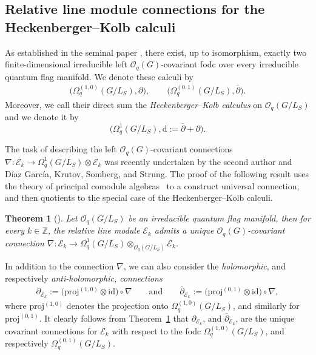 \documentclass[pdftex]{sigma}
\numberwithin{equation}{section}
\newtheorem{Theorem}{Theorem}[section]
\begin{document}
\subsection{Relative line module connections for the Heckenberger--Kolb calculi}\label{section3.2}

As established in the seminal paper \cite{HKdR}, there exist, up to isomorphism, exactly two finite-dimensional irreducible left $\mathcal{O}_q(G)$-covariant fodc over every irreducible quantum flag manifold. We denote these calculi by
\begin{gather*}
\big(\Omega^{(1,0)}_q(G/L_S), \partial\big), \qquad \big(\Omega^{(0,1)}_q(G/L_S),\overline{\partial}\big).
\end{gather*}
Moreover, we call their direct sum the \emph{Heckenberger--Kolb calculus} on $\mathcal{O}_q(G/L_S)$ and we denote it by
\[
\big(\Omega^1_q(G/L_S),\mathrm{d}:=\overline{\partial}+\partial\big) .
\]

The task of describing the left $\mathcal{O}_q(G)$-covariant connections $\nabla\colon \mathcal{E}_k \to \Omega^1_q(G/L_S) \otimes \mathcal{E}_k$ was recently undertaken by the second author and D\'iaz Garc\'ia, Krutov, Somberg, and Strung. The proof of the following result uses the theory of principal comodule algebras~\cite{TBGS} to a construct universal connection, and then quotients to the special case of the Heckenberger--Kolb calculi.

\begin{Theorem}[{\cite[Theorem 4.5]{HVBQFM}}] \label{thm:CovConn}
Let $\mathcal{O}_q(G/L_S)$ be an irreducible quantum flag manifold, then for every $k \in \mathbb{Z}$, the relative line module $\mathcal{E}_k$ admits a unique $\mathcal{O}_q(G)$-covariant connection $\nabla\colon \mathcal{E}_k \to \Omega^1_q(G/L_S) \otimes_{\mathcal{O}_q(G/L_S)} \mathcal{E}_k$.
\end{Theorem}

In addition to the connection $\nabla$, we can also consider the \emph{holomorphic}, and respectively \emph{anti-holomorphic, connections}
\begin{gather*}
\partial_{\mathcal{E}_k}:= \big(\mathrm{proj}^{(1,0)}\otimes \mathrm{id} \big)\circ\nabla \qquad \mathrm{and} \qquad \overline{\partial}_{\mathcal{E}_k}:=\big(\mathrm{proj}^{(0,1)}\otimes \mathrm{id}\big)\circ\nabla,
\end{gather*}
where $\mathrm{proj}^{(1,0)}$ denotes the projection onto $\Omega^{(1,0)}_q(G/L_S)$, and similarly for $\mathrm{proj}^{(0,1)}$. It clearly follows from Theorem~\ref{thm:CovConn} that $\partial_{\mathcal{E}_k}$, and $\overline{\partial}_{\mathcal{E}_k}$, are the unique covariant connections for $\mathcal{E}_k$ with respect to the fodc $\Omega^{(1,0)}_q(G/L_S)$, and respectively $\Omega^{(0,1)}_q(G/L_S)$.
\end{document}
